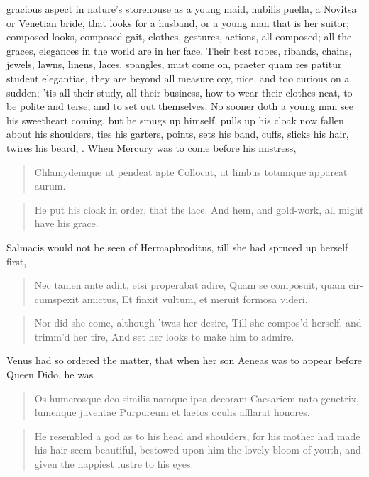 gracious aspect in nature's storehouse as a young maid, nubilis puella,
a Novitsa or Venetian bride, that looks for a husband, or a young man
that is her suitor; composed looks, composed gait, clothes, gestures,
actions, all composed; all the graces, elegances in the world are in
her face. Their best robes, ribands, chains, jewels, lawns, linens,
laces, spangles, must come on, praeter quam res patitur student
elegantiae, they are beyond all measure coy, nice, and too curious on a
sudden; 'tis all their study, all their business, how to wear their
clothes neat, to be polite and terse, and to set out themselves. No
sooner doth a young man see his sweetheart coming, but he smugs up
himself, pulls up his cloak now fallen about his shoulders, ties his
garters, points, sets his band, cuffs, slicks his hair, twires his
beard, \etc{}. When Mercury was to come before his mistress,

\begin{latin}
\begin{verse}
Chlamydemque ut pendeat apte
Collocat, ut limbus totumque appareat aurum.
\end{verse}
\end{latin}
\translationrule%
\begin{verse}%
He put his cloak in order, that the lace.
And hem, and gold-work, all might have his grace.
\end{verse}%

Salmacis would not be seen of Hermaphroditus, till she had spruced up
herself first,

\begin{latin}
\begin{verse}
Nec tamen ante adiit, etsi properabat adire,
Quam se composuit, quam circumspexit amictus,
Et finxit vultum, et meruit formosa videri.
\end{verse}
\end{latin}
\translationrule%
\begin{verse}%
Nor did she come, although 'twas her desire,
Till she compos'd herself, and trimm'd her tire,
And set her looks to make him to admire.
\end{verse}%

Venus had so ordered the matter, that when her son Aeneas was to
appear before Queen Dido, he was

\begin{latin}
\begin{verse}
Os humerosque deo similis namque ipsa decoram
Caesariem nato genetrix, lumenque juventae
Purpureum et laetos oculis afflarat honores.
\end{verse}
\end{latin}
\translationrule%
\begin{verse}%
He resembled a god as to his head and shoulders,
for his mother had made his hair seem beautiful,
bestowed upon him the lovely bloom of youth,
and given the happiest lustre to his eyes.
\end{verse}%

